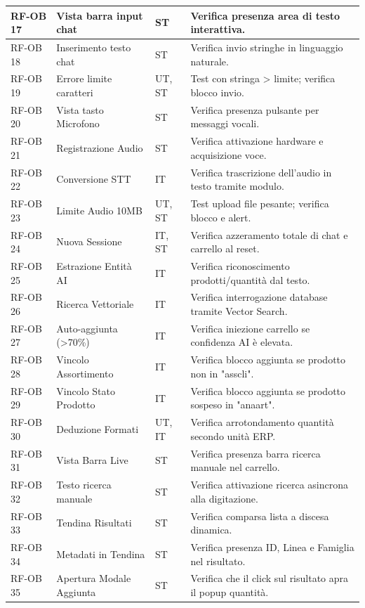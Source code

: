 \documentclass[a4paper,11pt,oneside]{scrartcl}
\begin{document}
\begin{longtable}{|p{1.5cm}|p{4.5cm}|p{1.8cm}|p{6cm}|}
RF-OB 17 & Vista barra input chat & ST & Verifica presenza area di testo interattiva. \\ \hline
RF-OB 18 & Inserimento testo chat & ST & Verifica invio stringhe in linguaggio naturale. \\ \hline
RF-OB 19 & Errore limite caratteri & UT, ST & Test con stringa > limite; verifica blocco invio. \\ \hline
RF-OB 20 & Vista tasto Microfono & ST & Verifica presenza pulsante per messaggi vocali. \\ \hline
RF-OB 21 & Registrazione Audio & ST & Verifica attivazione hardware e acquisizione voce. \\ \hline
RF-OB 22 & Conversione STT & IT & Verifica trascrizione dell'audio in testo tramite modulo. \\ \hline
RF-OB 23 & Limite Audio 10MB & UT, ST & Test upload file pesante; verifica blocco e alert. \\ \hline
RF-OB 24 & Nuova Sessione & IT, ST & Verifica azzeramento totale di chat e carrello al reset. \\ \hline
RF-OB 25 & Estrazione Entità AI & IT & Verifica riconoscimento prodotti/quantità dal testo. \\ \hline
RF-OB 26 & Ricerca Vettoriale & IT & Verifica interrogazione database tramite Vector Search. \\ \hline
RF-OB 27 & Auto-aggiunta (>70\%) & IT & Verifica iniezione carrello se confidenza AI è elevata. \\ \hline
RF-OB 28 & Vincolo Assortimento & IT & Verifica blocco aggiunta se prodotto non in "asscli". \\ \hline
RF-OB 29 & Vincolo Stato Prodotto & IT & Verifica blocco aggiunta se prodotto sospeso in "anaart". \\ \hline
RF-OB 30 & Deduzione Formati & UT, IT & Verifica arrotondamento quantità secondo unità ERP. \\ \hline
RF-OB 31 & Vista Barra Live & ST & Verifica presenza barra ricerca manuale nel carrello. \\ \hline
RF-OB 32 & Testo ricerca manuale & ST & Verifica attivazione ricerca asincrona alla digitazione. \\ \hline
RF-OB 33 & Tendina Risultati & ST & Verifica comparsa lista a discesa dinamica. \\ \hline
RF-OB 34 & Metadati in Tendina & ST & Verifica presenza ID, Linea e Famiglia nel risultato. \\ \hline
RF-OB 35 & Apertura Modale Aggiunta & ST & Verifica che il click sul risultato apra il popup quantità. \\ \hline

\end{longtable}
\end{document}
